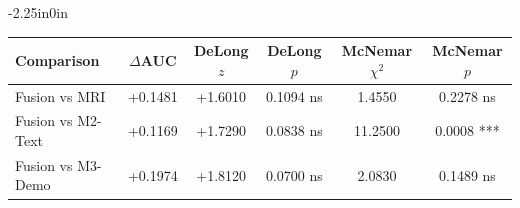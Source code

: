 \documentclass[10pt,letterpaper]{article}
\begin{document}
\begin{table}[!t]
\begin{adjustwidth}{-2.25in}{0in}
                                                                                                                          \begin{tabular}{|l|c|c|c|c|c|}
                                                                                                                          \hline
                                                                                                                          \textbf{Comparison} & \textbf{$\Delta$AUC} & \textbf{DeLong $z$} & \textbf{DeLong $p$} & \textbf{McNemar $\chi^2$} & \textbf{McNemar $p$} \\
                                                                                                                          \hline
                                                                                                                          Fusion vs MRI & +0.1481 & +1.6010 & 0.1094 ns & 1.4550 & 0.2278 ns \\
                                                                                                                          \hline
                                                                                                                          Fusion vs M2-Text & +0.1169 & +1.7290 & 0.0838 ns & 11.2500 & 0.0008 *** \\
                                                                                                                          \hline
                                                                                                                          Fusion vs M3-Demo & +0.1974 & +1.8120 & 0.0700 ns & 2.0830 & 0.1489 ns \\
                                                                                                                          \hline
                                                                                                                          \end{tabular}
                                                                                                                          

\end{adjustwidth}
\end{table}
\end{document}
